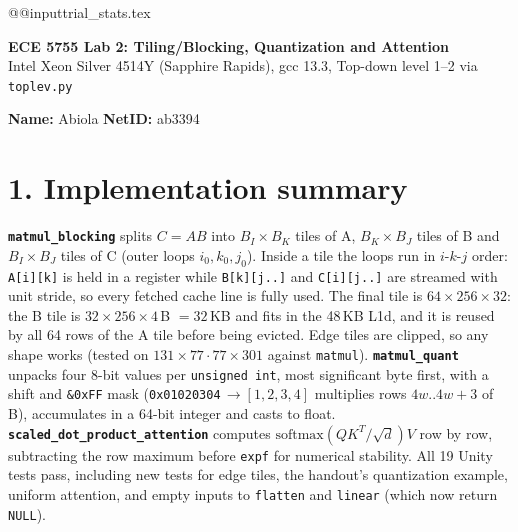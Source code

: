 \documentclass[10pt]{article}
\begin{document}
\csname @@input\endcsname trial_stats.tex
\begin{center}
{\Large\textbf{ECE 5755 Lab 2: Tiling/Blocking, Quantization and Attention}}\\[1pt]
\small Intel Xeon Silver 4514Y (Sapphire Rapids), gcc 13.3, Top-down level 1--2 via \texttt{toplev.py}
\end{center}
\textbf{Name:} Abiola \hfill \textbf{NetID:} ab3394

\section*{1. Implementation summary}
\textbf{\texttt{matmul\_blocking}} splits $C=AB$ into $B_I\times B_K$ tiles of A, $B_K\times B_J$ tiles of B and $B_I\times B_J$ tiles of C (outer loops $i_0,k_0,j_0$). Inside a tile the loops run in $i$-$k$-$j$ order: \texttt{A[i][k]} is held in a register while \texttt{B[k][j..]} and \texttt{C[i][j..]} are streamed with unit stride, so every fetched cache line is fully used. The final tile is $64\times256\times32$: the B tile is $32\times256\times4$\,B $=32$\,KB and fits in the 48\,KB L1d, and it is reused by all 64 rows of the A tile before being evicted. Edge tiles are clipped, so any shape works (tested on $131\times77 \cdot 77\times301$ against \texttt{matmul}).
\textbf{\texttt{matmul\_quant}} unpacks four 8-bit values per \texttt{unsigned int}, most significant byte first, with a shift and \texttt{\&0xFF} mask (\texttt{0x01020304}$\,\to[1,2,3,4]$ multiplies rows $4w..4w{+}3$ of B), accumulates in a 64-bit integer and casts to float.
\textbf{\texttt{scaled\_dot\_product\_attention}} computes $\mathrm{softmax}(QK^T/\sqrt{d})V$ row by row, subtracting the row maximum before \texttt{expf} for numerical stability. All 19 Unity tests pass, including new tests for edge tiles, the handout's quantization example, uniform attention, and empty inputs to \texttt{flatten} and \texttt{linear} (which now return \texttt{NULL}).
\end{document}
